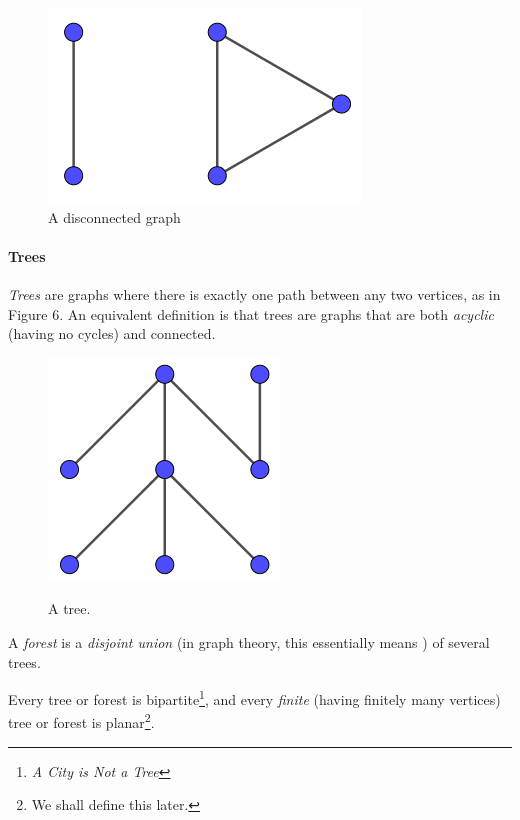\begin{figure}[h]
\centering
\includegraphics{disconnectedgraph.png}
\caption{A disconnected graph}
\label{disconnectedgraph}
\end{figure}



\paragraph{Trees}

\textit{Trees} are graphs where there is exactly one path between any two vertices, as in Figure 6. An equivalent definition is that trees are graphs that are both \textit{acyclic} (having no cycles) and connected.



\begin{figure}[h]
\centering
\includegraphics{treegraph.png}
\label{treegraph}
\caption{A tree.}
\end{figure}



A \textit{forest} is a \textit{disjoint union} (in graph theory, this essentially means ) of several trees.

Every tree or forest is bipartite\footnote{\textit{A City is Not a Tree}}, and every \textit{finite} (having finitely many vertices) tree or forest is planar\footnote{We shall define this later.}.

